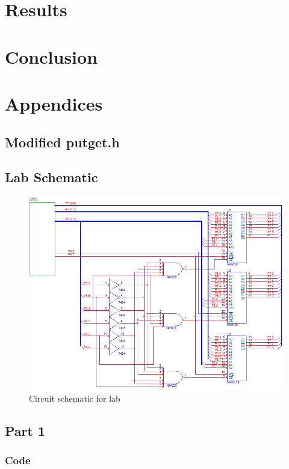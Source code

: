 \documentclass[12pt]{article}
\begin{document}
\section{Results}


\section{Conclusion}


\section{Appendices}
\subsection{Modified putget.h}

\subsection{Lab Schematic}
	\begin{figure}[H]
		\centering
		\includegraphics[width=\textwidth]{Schematic.png}
		\caption{Circuit schematic for lab}
		\label{schematic}
	\end{figure}
\subsection{Part 1}
\subsubsection{Code}
	
\end{document}
